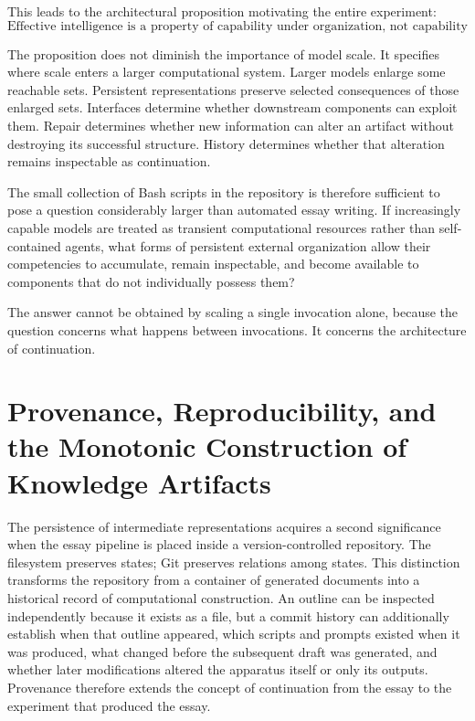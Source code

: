 \documentclass[11pt]{article}
\begin{document}
This leads to the architectural proposition motivating the entire experiment:
\[
    \boxed{
    \text{Effective intelligence is a property of capability under organization,
    not capability in isolation.}
    }
\]

The proposition does not diminish the importance of model scale. It specifies where scale enters a larger computational system. Larger models enlarge some reachable sets. Persistent representations preserve selected consequences of those enlarged sets. Interfaces determine whether downstream components can exploit them. Repair determines whether new information can alter an artifact without destroying its successful structure. History determines whether that alteration remains inspectable as continuation.

The small collection of Bash scripts in the repository is therefore sufficient to pose a question considerably larger than automated essay writing. If increasingly capable models are treated as transient computational resources rather than self-contained agents, what forms of persistent external organization allow their competencies to accumulate, remain inspectable, and become available to components that do not individually possess them?

The answer cannot be obtained by scaling a single invocation alone, because the question concerns what happens between invocations. It concerns the architecture of continuation.

\section{Provenance, Reproducibility, and the Monotonic Construction of Knowledge Artifacts}

The persistence of intermediate representations acquires a second significance when the essay pipeline is placed inside a version-controlled repository. The filesystem preserves states; Git preserves relations among states. This distinction transforms the repository from a container of generated documents into a historical record of computational construction. An outline can be inspected independently because it exists as a file, but a commit history can additionally establish when that outline appeared, which scripts and prompts existed when it was produced, what changed before the subsequent draft was generated, and whether later modifications altered the apparatus itself or only its outputs. Provenance therefore extends the concept of continuation from the essay to the experiment that produced the essay.
\end{document}
